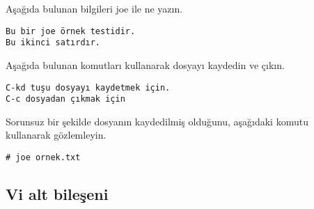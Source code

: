 \documentclass[a4paper,10pt]{article}
\begin{document}
Aşağıda bulunan bilgileri joe ile ne yazın.
\begin{verbatim}
Bu bir joe örnek testidir.
Bu ikinci satırdır.
\end{verbatim}

Aşağıda bulunan komutları kullanarak dosyayı kaydedin ve çıkın.
\begin{verbatim}
C-kd tuşu dosyayı kaydetmek için.
C-c dosyadan çıkmak için
\end{verbatim}


Sorunsuz bir şekilde dosyanın kaydedilmiş olduğunu, aşağıdaki komutu kullanarak gözlemleyin.
\begin{verbatim}
# joe ornek.txt 
\end{verbatim}

\subsection*{Vi alt bileşeni}
\end{document}
